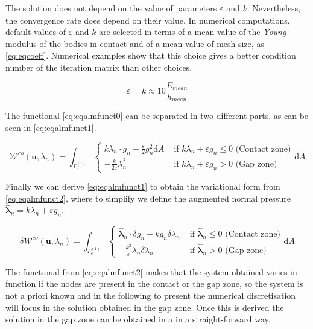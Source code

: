 \documentclass[a4paper,10pt]{article} %
\begin{document}
The solution does not depend on the value of parameters $\varepsilon$ and $k$. Nevertheless, the convergence rate does depend on their value. In numerical computations, default values of $\varepsilon$ and $k$ are selected in terms of a mean value of the \textit{Young} modulus of the bodies in contact and of a mean value of mesh size, as \eqref{eq:eqcoeff}. Numerical examples show that this choice gives a better condition number of the iteration matrix than other choices. 

\begin{equation}\label{eq:eqcoeff}
    \varepsilon = k \approx 10 \frac{E_{mean}}{h_{mean}}
\end{equation}

The functional \eqref{eq:eqalmfunct0} can be separated in two different parts, as can be seen in \eqref{eq:eqalmfunct1}.

\begin{equation}\label{eq:eqalmfunct1}
    \mathcal{W}^{co}(\mathbf{u},\lambda_n) = \int_{\Gamma_c^{(1)}} \begin{cases}  k \lambda_n \cdot g_n  + \frac{\varepsilon}{2} g_n^2 \text{d}A & \text{ if } k\lambda_n +\varepsilon g_n \leq 0 \text{ (Contact zone)} \\ - \frac{k}{2\varepsilon} \lambda_n^2   & \text{ if } k\lambda_n +\varepsilon g_n > 0 \text{ (Gap zone)} \end{cases}\text{d}A 
\end{equation}

Finally we can derive \eqref{eq:eqalmfunct1} to obtain the variational form from \eqref{eq:eqalmfunct2}, where to simplify we define the augmented normal pressure $\hat{\boldsymbol{\lambda}}_{n} = k\lambda_n +\varepsilon g_n $.

\begin{equation}\label{eq:eqalmfunct2}
    \delta \mathcal{W}^{co}(\mathbf{u},\lambda_n) = \int_{\Gamma_c^{(1)}}\begin{cases}  \hat{\boldsymbol{\lambda}}_{n} \cdot \delta g_n + k g_n \delta\lambda_n & \text{ if } \hat{\boldsymbol{\lambda}}_{n} \leq 0 \text{ (Contact zone)} \\  - \frac{k^2}{\varepsilon} \lambda_n \delta\lambda_n & \text{ if } \hat{\boldsymbol{\lambda}}_{n} > 0 \text{ (Gap zone)} \end{cases} \text{d}A 
\end{equation}

The functional from \eqref{eq:eqalmfunct2} makes that the system obtained varies in function if the nodes are present in the contact or the gap zone, so the system is not a priori known and in the following to present the numerical discretisation will focus in the solution obtained in the gap zone. Once this is derived the solution in the gap zone can be obtained in a in a straight-forward way.
\end{document}
